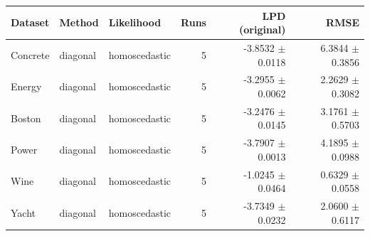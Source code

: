 \begin{tabular}{lllrrr}
\toprule
Dataset & Method & Likelihood & Runs & LPD (original) & RMSE \\
\midrule
Concrete & diagonal & homoscedastic & 5 & -3.8532 $\pm$ 0.0118 & 6.3844 $\pm$ 0.3856 \\
Energy & diagonal & homoscedastic & 5 & -3.2955 $\pm$ 0.0062 & 2.2629 $\pm$ 0.3082 \\
Boston & diagonal & homoscedastic & 5 & -3.2476 $\pm$ 0.0145 & 3.1761 $\pm$ 0.5703 \\
Power & diagonal & homoscedastic & 5 & -3.7907 $\pm$ 0.0013 & 4.1895 $\pm$ 0.0988 \\
Wine & diagonal & homoscedastic & 5 & -1.0245 $\pm$ 0.0464 & 0.6329 $\pm$ 0.0558 \\
Yacht & diagonal & homoscedastic & 5 & -3.7349 $\pm$ 0.0232 & 2.0600 $\pm$ 0.6117 \\
\bottomrule
\end{tabular}
